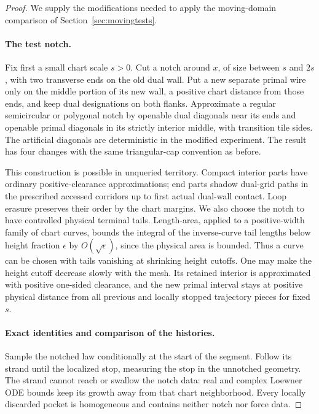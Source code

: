 \begin{proof}
We supply the modifications needed to apply the moving-domain
comparison of Section~\ref{sec:movingtests}.

\paragraph{The test notch.}
Fix first a small chart scale $s>0$.  Cut a notch around $x$, of size
between $s$ and $2s$, with two transverse ends on the old dual wall.
Put a new separate primal wire only on the middle portion of its new
wall, a positive chart distance from those ends, and keep dual
designations on both flanks.  Approximate a regular semicircular or
polygonal notch by openable dual diagonals near its ends and openable
primal diagonals in its strictly interior middle, with transition tile
sides.  The artificial diagonals are deterministic in the modified
experiment.  The result has four changes with the same triangular-cap
convention as before.

This construction is possible in unqueried territory.  Compact
interior parts have ordinary positive-clearance approximations; end
parts shadow dual-grid paths in the prescribed accessed corridors up
to first actual dual-wall contact.  Loop erasure preserves their order
by the chart margins.  We also choose the notch to have controlled
physical terminal tails.  Length-area, applied to a positive-width
family of chart curves, bounds the integral of the inverse-curve tail
lengths below height fraction $\epsilon$ by $O(\sqrt\epsilon)$, since
the physical area is bounded.  Thus a curve can be chosen with tails
vanishing at shrinking height cutoffs.  One may make the height cutoff
decrease slowly with the mesh.  Its retained interior is approximated
with positive one-sided clearance, and the new primal interval stays
at positive physical distance from all previous and locally stopped
trajectory pieces for fixed $s$.

\paragraph{Exact identities and comparison of the histories.}
Sample the notched law conditionally at the start of the segment.
Follow its strand until the localized stop, measuring the stop in the
unnotched geometry.  The strand cannot reach or swallow the notch
data: real and complex Loewner ODE bounds keep its growth away from
that chart neighborhood.  Every locally discarded pocket is
homogeneous and contains neither notch nor force data.


\end{proof}
